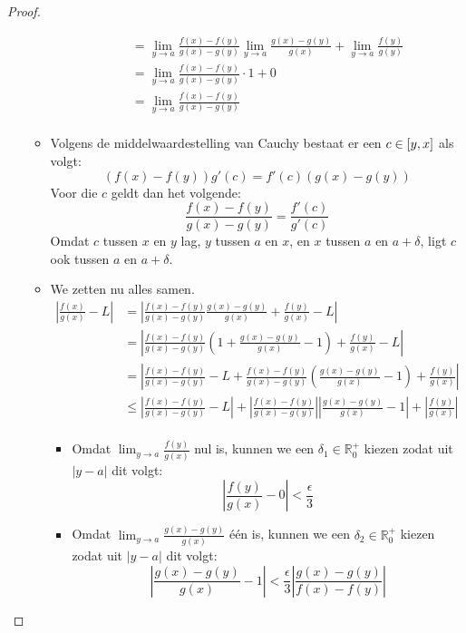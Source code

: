 \documentclass[main.tex]{subfiles}
\begin{document}
\begin{st}
\begin{proof}
\begin{itemize}
\begin{itemize}
\[\begin{array}{rcl}
          &&= \lim_{y \rightarrow a}\frac{f(x)-f(y)}{g(x)-g(y)}\lim_{y \rightarrow a}\frac{g(x)-g(y)}{g(x)} + \lim_{y \rightarrow a}\frac{f(y)}{g(y)}\\
          &&= \lim_{y \rightarrow a}\frac{f(x)-f(y)}{g(x)-g(y)} \cdot 1 + 0\\
          &&= \lim_{y \rightarrow a}\frac{f(x)-f(y)}{g(x)-g(y)}\\
        \end{array}
        \]
      \item 
        Volgens de middelwaardestelling van Cauchy bestaat er een $c\in \interval{y}{x}$ als volgt:
        \[ \left( f(x) - f(y) \right) g'(c) = f'(c) \left( g(x) - g(y) \right) \]
        Voor die $c$ geldt dan het volgende:
        \[ \frac{f(x)-f(y)}{g(x)-g(y)} = \frac{f'(c)}{g'(c)} \]
        Omdat $c$ tussen $x$ en $y$ lag, $y$ tussen $a$ en $x$, en $x$ tussen $a$ en $a+\delta$, ligt $c$ ook tussen $a$ en $a+\delta$.
      \item 
        We zetten nu alles samen.
        \begin{align*}
          \left| \frac{f(x)}{g(x)} - L \right|
          &= \left| \frac{f(x)-f(y)}{g(x)-g(y)}\frac{g(x)-g(y)}{g(x)} + \frac{f(y)}{g(x)} - L \right|\\
          &= \left| \frac{f(x)-f(y)}{g(x)-g(y)}\left(1 + \frac{g(x)-g(y)}{g(x)} - 1\right) + \frac{f(y)}{g(x)} - L \right|\\
          &= \left| \frac{f(x)-f(y)}{g(x)-g(y)} - L + \frac{f(x)-f(y)}{g(x)-g(y)} \left(\frac{g(x)-g(y)}{g(x)} - 1\right) + \frac{f(y)}{g(x)} \right|\\
          &\le \left| \frac{f(x)-f(y)}{g(x)-g(y)} - L\right| + \left|\frac{f(x)-f(y)}{g(x)-g(y)} \right|\left|\frac{g(x)-g(y)}{g(x)} - 1\right| + \left|\frac{f(y)}{g(x)} \right|\\
        \end{align*}
        \begin{itemize}
        \item 
          Omdat $\lim_{y\rightarrow a}\frac{f(y)}{g(x)}$ nul is, kunnen we een $\delta_{1}\in \mathbb{R}_{0}^{+}$ kiezen zodat uit $|y-a|$ dit volgt:
          \[ \left| \frac{f(y)}{g(x)} - 0 \right| < \frac{\epsilon}{3}\]
        \item Omdat $\lim_{y\rightarrow a}\frac{g(x)-g(y)}{g(x)}$ \'e\'en is, kunnen we een $\delta_{2}\in \mathbb{R}_{0}^{+}$ kiezen zodat uit $|y-a|$ dit volgt:
          \[ \left|\frac{g(x)-g(y)}{g(x)} - 1\right| < \frac{\epsilon}{3}\left|\frac{g(x)-g(y)}{f(x)-f(y)}\right|  \]

\end{itemize}
\end{itemize}
\end{itemize}
\end{proof}
\end{st}
\end{document}
